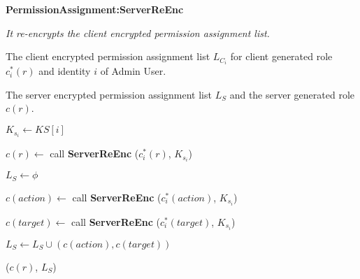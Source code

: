 \documentclass[epsfig,a4paper,11pt,titlepage]{book}
\numberwithin{algorithm}{chapter}
\newcommand{\algofontsize}{\fontsize{11}{12}\selectfont}
\begin{document}
\begin{algorithm} [htp]
{\algofontsize
\caption{\textbf{PermissionAssignment:ServerReEnc}}

\label{algo:erbac-deploy-permission-assignment-server-side}

\begin{algorithmic}[1]

\INPUT \emph{It re-encrypts the client encrypted permission assignment list.}

\Require The client encrypted permission assignment list $L_{C_i}$ for client generated role $c^*_i (r)$ and identity $i$ of Admin User.

\Ensure The server encrypted permission assignment list $L_{S}$ and the server generated role $c(r)$.

\medskip

\State $K_{s_i} \leftarrow KS[i]$ {\algofontsize {}} \label{line:erbac-deploy-pa-ss-ks}

\State $c(r) \leftarrow$ call \textbf{ServerReEnc} ($c^*_i (r)$, $K_{s_i}$) \label{line:erbac-deploy-pa-ss-role}

\State $L_{S} \leftarrow \phi$ \label{line:erbac-deploy-pa-ss-init}

 \label{line:erbac-deploy-pa-ss-loop}

	\State $c(action) \leftarrow$ call \textbf{ServerReEnc} ($c^*_i (action)$, $K_{s_i}$) \label{line:erbac-deploy-pa-ss-action}
	
	\State $c(target) \leftarrow$ call \textbf{ServerReEnc} ($c^*_i (target)$, $K_{s_i}$) \label{line:erbac-deploy-pa-ss-target}
	
	\State $L_{S} \leftarrow L_{S} \cup (c(action), c(target))$ \label{line:erbac-deploy-pa-ss-update}

\EndFor

\Return ($c(r)$, $L_{S}$)

\end{algorithmic}
}
\end{algorithm}
\end{document}
